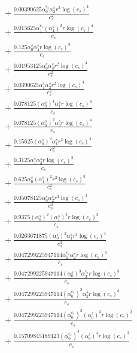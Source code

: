 \documentclass[10pt]{article}
\begin{document}
\begin{align*}
&{}  + \frac{0.00390625 \alpha_{0}^{c_s} \alpha_{3}^s r^{2} \log{\left(c_{s} \right)}^{4}}{c_{s}^{2}} \\
&{}  + \frac{0.015625 \alpha_{1}^{c_s} \left(\alpha_{1}^s\right)^{2} r \log{\left(c_{s} \right)}^{4}}{c_{s}} \\
&{}  + \frac{0.125 \alpha_{0}^s \alpha_{4}^s r \log{\left(c_{s} \right)}^{3}}{c_{s}} \\
&{}  + \frac{0.01953125 \alpha_{0}^s \alpha_{3}^s r^{2} \log{\left(c_{s} \right)}^{4}}{c_{s}^{2}} \\
&{}  + \frac{0.0390625 \alpha_{1}^s \alpha_{2}^s r^{2} \log{\left(c_{s} \right)}^{4}}{c_{s}^{2}} \\
&{}  + \frac{0.078125 \left(\alpha_{0}^s\right)^{4} \alpha_{1}^s r \log{\left(c_{s} \right)}^{4}}{c_{s}} \\
&{}  + \frac{0.078125 \left(\alpha_{0}^s\right)^{2} \alpha_{3}^s r \log{\left(c_{s} \right)}^{4}}{c_{s}} \\
&{}  + \frac{0.15625 \left(\alpha_{0}^s\right)^{3} \alpha_{1}^s r^{2} \log{\left(c_{s} \right)}^{4}}{c_{s}^{2}} \\
&{}  + \frac{0.3125 \alpha_{1}^s \alpha_{3}^s r \log{\left(c_{s} \right)}^{3}}{c_{s}} \\
&{}  + \frac{0.625 \alpha_{0}^s \left(\alpha_{1}^s\right)^{2} r^{2} \log{\left(c_{s} \right)}^{3}}{c_{s}^{2}} \\
&{}  + \frac{0.05078125 \alpha_{0}^s \alpha_{2}^s r^{3} \log{\left(c_{s} \right)}^{3}}{c_{s}^{3}} \\
&{}  + \frac{0.9375 \left(\alpha_{0}^s\right)^{2} \left(\alpha_{1}^s\right)^{2} r \log{\left(c_{s} \right)}^{3}}{c_{s}} \\
&{}  + \frac{0.0263671875 \left(\alpha_{0}^s\right)^{2} \alpha_{1}^s r^{3} \log{\left(c_{s} \right)}^{4}}{c_{s}^{3}} \\
&{}  + \frac{0.047299225947114 \alpha_{2}^{c_s} \alpha_{2}^s r \log{\left(c_{s} \right)}^{3}}{c_{s}} \\
&{}  + \frac{0.047299225947114 \left(\alpha_{0}^s\right)^{3} \alpha_{2}^{c_s} r \log{\left(c_{s} \right)}^{3}}{c_{s}} \\
&{}  + \frac{0.047299225947114 \left(\alpha_{0}^{c_s}\right)^{3} \alpha_{2}^s r \log{\left(c_{s} \right)}^{3}}{c_{s}} \\
&{}  + \frac{0.047299225947114 \left(\alpha_{0}^{c_s}\right)^{3} \left(\alpha_{0}^s\right)^{3} r \log{\left(c_{s} \right)}^{3}}{c_{s}} \\
&{}  + \frac{0.15709845189423 \left(\alpha_{0}^{c_s}\right)^{2} \left(\alpha_{0}^s\right)^{4} r \log{\left(c_{s} \right)}^{3}}{c_{s}} \\

\end{align*}
\end{document}
